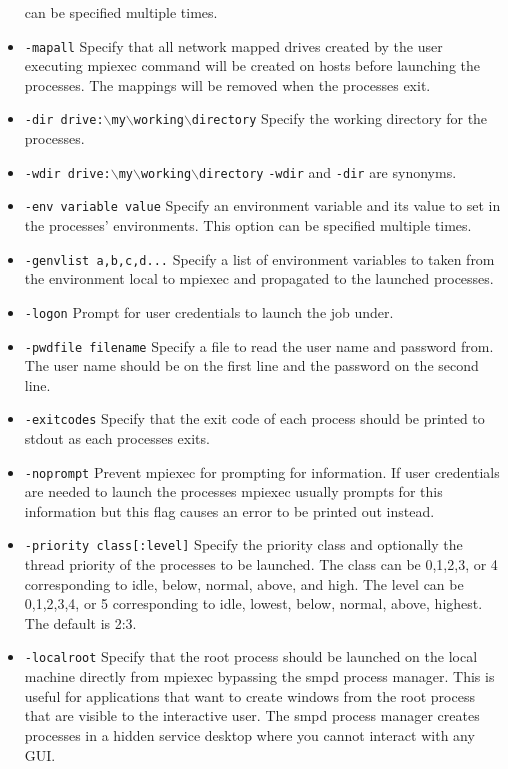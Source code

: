 \documentclass[dvipdfm,11pt]{article}
\begin{document}
\begin{itemize}
can be specified multiple times.
\item \texttt{-mapall}
Specify that all network mapped drives created by the user executing mpiexec
command will be created on hosts before launching the processes. The mappings
will be removed when the processes exit. 
\item \texttt{-dir drive:$\backslash$my$\backslash$working$\backslash$directory}
Specify the working directory for the processes.
\item \texttt{-wdir drive:$\backslash$my$\backslash$working$\backslash$directory}
\texttt{-wdir} and \texttt{-dir} are synonyms.
\item \texttt{-env variable value}
Specify an environment variable and its value to set in the processes' environments.
This option can be specified multiple times.
\item \texttt{-genvlist a,b,c,d...}
Specify a list of environment variables to taken from the environment local to mpiexec and propagated to the launched processes.
\item \texttt{-logon}
Prompt for user credentials to launch the job under.
\item \texttt{-pwdfile filename}
Specify a file to read the user name and password from.  The user name should be
on the first line and the password on the second line.
\item \texttt{-exitcodes}
Specify that the exit code of each process should be printed to stdout as each
processes exits.
\item \texttt{-noprompt}
Prevent mpiexec for prompting for information.  If user credentials are needed
to launch the processes mpiexec usually prompts for this information but this
flag causes an error to be printed out instead.
\item \texttt{-priority class[:level]}
Specify the priority class and optionally the thread priority of the processes
to be launched.  The class can be 0,1,2,3, or 4 corresponding to idle, below,
normal, above, and high.  The level can be 0,1,2,3,4, or 5 corresponding to
idle, lowest, below, normal, above, highest.  The default is 2:3.
\item \texttt{-localroot}
Specify that the root process should be launched on the local machine directly
from mpiexec bypassing the smpd process manager.  This is useful for applications
that want to create windows from the root process that are visible to the interactive
user.  The smpd process manager creates processes in a hidden service desktop
where you cannot interact with any GUI.

\end{itemize}
\end{document}
